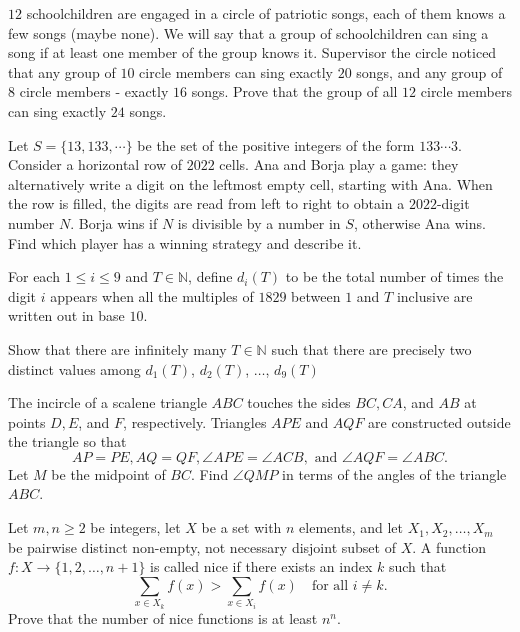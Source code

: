\documentclass[11pt]{scrartcl}
\begin{document}
\begin{problem}[8024569764169071557]
$12$ schoolchildren are engaged in a circle of patriotic songs, each of them knows a few songs (maybe none). We will say that a group of schoolchildren can sing a song if at least one member of the group knows it. Supervisor the circle noticed that any group of $10$ circle members can sing exactly $20$ songs, and any group of $8$ circle members - exactly $16$ songs. Prove that the group of all $12$ circle members can sing exactly $24$ songs.
\end{problem}
\begin{problem}[6728439333021242021]
Let $S=\{13, 133, \cdots\}$ be the set of the positive integers of the form $133 \cdots 3$. Consider a horizontal row of $2022$ cells. Ana and Borja play a game: they alternatively write a digit on the leftmost empty cell, starting with Ana. When the row is filled, the digits are read from left to right to obtain a $2022$-digit number $N$. Borja wins if $N$ is divisible by a number in $S$, otherwise Ana wins. Find which player has a winning strategy and describe it.
\end{problem}
\begin{problem}[526922799283626]
	For each $1\leq i\leq 9$ and $T\in\mathbb N$, define $d_i(T)$ to be the total number of times the digit $i$ appears when all the multiples of $1829$ between $1$ and $T$ inclusive are written out in base $10$.

Show that there are infinitely many $T\in\mathbb N$ such that there are precisely two distinct values among $d_1(T)$, $d_2(T)$, $\dots$, $d_9(T)$
\end{problem}
\begin{problem}[221552874820768]
The incircle of a scalene triangle $ABC$ touches the sides $BC, CA$, and $AB$ at points $D, E$, and $F$, respectively. Triangles $APE$ and $AQF$ are constructed outside the triangle so that\[AP =PE, AQ=QF, \angle APE=\angle ACB,\text{ and }\angle AQF =\angle ABC.\]Let $M$ be the midpoint of $BC$. Find $\angle QMP$ in terms of the angles of the triangle $ABC$.
\end{problem}
\begin{problem}[967014444176640]
Let $m,n \geqslant 2$ be integers, let $X$ be a set with $n$ elements, and let $X_1,X_2,\ldots,X_m$ be pairwise distinct non-empty, not necessary disjoint subset of $X$. A function $f \colon X \to \{1,2,\ldots,n+1\}$ is called nice if there exists an index $k$ such that\[\sum_{x \in X_k} f(x)>\sum_{x \in X_i} f(x) \quad \text{for all } i \ne k.\]Prove that the number of nice functions is at least $n^n$.
\end{problem}
\end{document}
